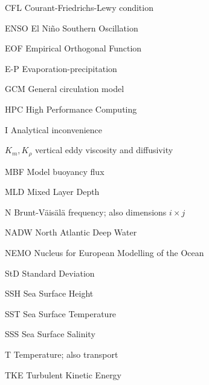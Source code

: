 \documentclass[a4paper,12pt, openright, titlepage]{book}
\begin{document}
\begin{abbrv}
\item[CFL]                   Courant-Friedrichs-Lewy condition\\
\item[ENSO]                  El Ni\~{n}o Southern Oscillation\\
\item[EOF]                   Empirical Orthogonal Function\\
\item[E-P]                   Evaporation-precipitation\\
\item[GCM]                   General circulation model\\ 
\item[HPC]                   High Performance Computing\\
\item[I]                     Analytical inconvenience\\
\item[$K_{m}, K_{\rho}$]     vertical eddy viscosity and diffusivity\\
\item[MBF]                   Model buoyancy flux\\
\item[MLD]                   Mixed Layer Depth\\
\item[N]                     Brunt-V\"{a}is\"{a}l\"{a} frequency; also dimensions $i \times j$\\
\item[NADW]                  North Atlantic Deep Water\\
\item[NEMO]                  Nucleus for European Modelling of the Ocean\\
\item[StD]                   Standard Deviation\\
\item[SSH]                   Sea Surface Height\\
\item[SST]                   Sea Surface Temperature\\
\item[SSS]                   Sea Surface Salinity\\
\item[T]		     Temperature; also transport\\
\item[TKE]                   Turbulent Kinetic Energy\\

\end{abbrv}
\end{document}
